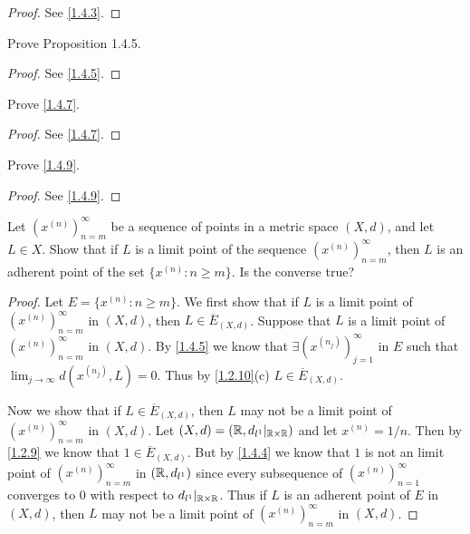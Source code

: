\begin{proof}
  See \cref{1.4.3}.
\end{proof}

\begin{ex}\label{ex:1.4.2}
  Prove Proposition 1.4.5.
\end{ex}

\begin{proof}
  See \cref{1.4.5}.
\end{proof}

\begin{ex}\label{ex:1.4.3}
  Prove \cref{1.4.7}.
\end{ex}

\begin{proof}
  See \cref{1.4.7}.
\end{proof}

\begin{ex}\label{ex:1.4.4}
  Prove \cref{1.4.9}.
\end{ex}

\begin{proof}
  See \cref{1.4.9}.
\end{proof}

\begin{ex}\label{ex:1.4.5}
  Let \((x^{(n)})_{n = m}^\infty\) be a sequence of points in a metric space \((X, d)\), and let \(L \in X\).
  Show that if \(L\) is a limit point of the sequence \((x^{(n)})_{n = m}^\infty\), then \(L\) is an adherent point of the set \(\{x^{(n)} : n \geq m\}\).
  Is the converse true?
\end{ex}

\begin{proof}
  Let \(E = \{x^{(n)} : n \geq m\}\).
  We first show that if \(L\) is a limit point of \((x^{(n)})_{n = m}^\infty\) in \((X, d)\), then \(L \in \overline{E}_{(X, d)}\).
  Suppose that \(L\) is a limit point of \((x^{(n)})_{n = m}^\infty\) in \((X, d)\).
  By \cref{1.4.5} we know that \(\exists (x^{(n_j)})_{j = 1}^\infty\) in \(E\) such that \(\lim_{j \to \infty} d(x^{(n_j)}, L) = 0\).
  Thus by \cref{1.2.10}(c) \(L \in \overline{E}_{(X, d)}\).

  Now we show that if \(L \in \overline{E}_{(X, d)}\), then \(L\) may not be a limit point of \((x^{(n)})_{n = m}^\infty\) in \((X, d)\).
  Let \((X, d) = (\mathbb{R}, d_{l^1}|_{\mathbb{R} \times \mathbb{R}})\) and let \(x^{(n)} = 1 / n\).
  Then by \cref{1.2.9} we know that \(1 \in \overline{E}_{(X, d)}\).
  But by \cref{1.4.4} we know that \(1\) is not an limit point of \((x^{(n)})_{n = m}^\infty\) in \((\mathbb{R}, d_{l^1})\) since every subsequence of \((x^{(n)})_{n = 1}^\infty\) converges to \(0\) with respect to \(d_{l^1}|_{\mathbb{R} \times \mathbb{R}}\).
  Thus if \(L\) is an adherent point of \(E\) in \((X, d)\), then \(L\) may not be a limit point of \((x^{(n)})_{n = m}^\infty\) in \((X, d)\).
\end{proof}

